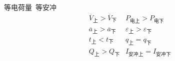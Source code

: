 等电荷量\ 等安冲
\[ \begin{array}{ll}
\overline{V}_{\text{上}}>\overline{V}_{\text{下}} & P_{\text{电上}}>P_{\text{电下}}\\
\overline{a}_{\text{上}}>\overline{a}_{\text{下}} & \varepsilon_{\text{上}}>\varepsilon_{\text{下}}\\
t_{\text{上}}<t_{\text{下}} & q_{\text{上}}=q_{\text{下}}\\
Q_{\text{上}}>Q_{\text{下}} & I_{\text{安冲上}}=I_{\text{安冲下}}
\end{array} \] %
